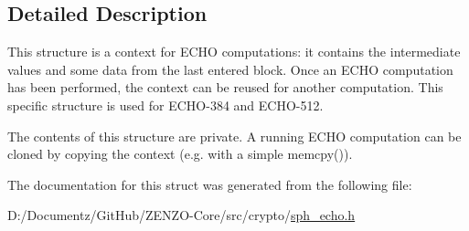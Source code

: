 \subsection{Detailed Description}
This structure is a context for E\+C\+HO computations\+: it contains the intermediate values and some data from the last entered block. Once an E\+C\+HO computation has been performed, the context can be reused for another computation. This specific structure is used for E\+C\+H\+O-\/384 and E\+C\+H\+O-\/512.

The contents of this structure are private. A running E\+C\+HO computation can be cloned by copying the context (e.\+g. with a simple {\ttfamily memcpy()}). 

The documentation for this struct was generated from the following file\+:\begin{DoxyCompactItemize}
\item 
D\+:/\+Documentz/\+Git\+Hub/\+Z\+E\+N\+Z\+O-\/\+Core/src/crypto/\mbox{\hyperlink{sph__echo_8h}{sph\+\_\+echo.\+h}}\end{DoxyCompactItemize}
